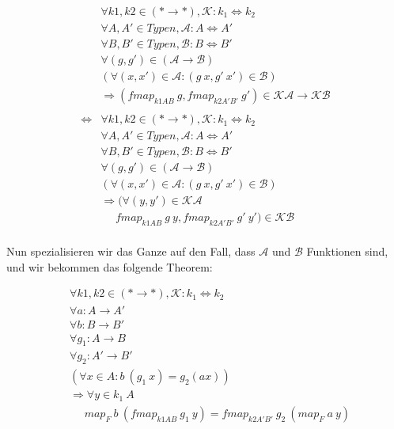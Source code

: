 \begin{align*}
&\forall k1, k2 \in (* \rightarrow *), \mathcal{K} : k_1 \Leftrightarrow k_2 \\
&\forall A, A' \in Typen, \mathcal{A} : A \Leftrightarrow A' \\
&\forall B, B' \in Typen, \mathcal{B} : B \Leftrightarrow B' \\
&\forall (g, g') \in (\mathcal{A} \rightarrow \mathcal{B}) \\
&(\forall (x, x') \in \mathcal{A}: (g\ x, g'\ x') \in \mathcal{B})\\
&\Rightarrow (fmap_{k1 A B}\ g, fmap_{k2 A' B'}\ g') \in \mathcal{K} \mathcal{A} \rightarrow \mathcal{K} \mathcal{B} \\
&\\
\Leftrightarrow &\forall k1, k2 \in (* \rightarrow *), \mathcal{K} : k_1 \Leftrightarrow k_2 \\
&\forall A, A' \in Typen, \mathcal{A} : A \Leftrightarrow A' \\
&\forall B, B' \in Typen, \mathcal{B} : B \Leftrightarrow B' \\
&\forall (g, g') \in (\mathcal{A} \rightarrow \mathcal{B}) \\
&(\forall (x, x') \in \mathcal{A}: (g\ x, g'\ x') \in \mathcal{B})\\
&\Rightarrow (\forall (y, y') \in \mathcal{K} \mathcal{A} \\
&\ \ \ \ \ \ fmap_{k1 A B}\ g\ y, fmap_{k2 A' B'}\ g'\ y') \in \mathcal{K} \mathcal{B}\\
\end{align*}

Nun spezialisieren wir das Ganze auf den Fall, dass $\mathcal{A}$ und $\mathcal{B}$ Funktionen sind, und wir bekommen das
folgende Theorem:

\begin{align*}
&\forall k1, k2 \in (* \rightarrow *), \mathcal{K} : k_1 \Leftrightarrow k_2 \\
&\forall a : A \rightarrow A' \\
&\forall b : B \rightarrow B' \\
&\forall g_1 : A \rightarrow B\\
&\forall g_2 : A' \rightarrow B' \\
&(\forall x \in A : b\ (g_1\ x) = g_2 (a x))\\
&\Rightarrow \forall y \in k_1\ A\\
&\ \ \ \ \ \ map_F\ b\ (fmap_{k1 A B}\ g_1\ y) = fmap_{k2 A' B'}\ g_2\ (map_F\ a\ y)
\end{align*}

